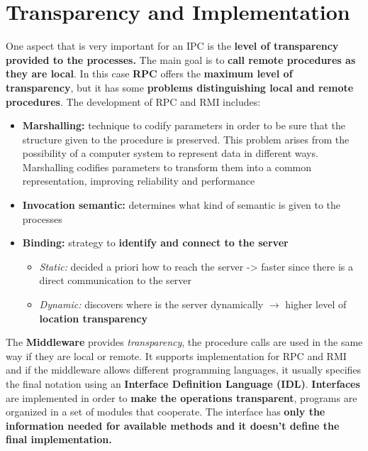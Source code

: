 \section{Transparency and Implementation}
One aspect that is very important for an IPC is the \textbf{level of transparency provided to the processes.} The main goal is to \textbf{call remote procedures as they are local}. In this case \textbf{RPC} offers the \textbf{maximum level of transparency}, but it has some \textbf{problems distinguishing local and remote procedures}. The development of RPC and RMI includes:
\begin{itemize}
    \item \textbf{Marshalling:} technique to codify parameters in order to be sure that the structure given to the procedure is preserved. This problem arises from the possibility of a computer system to represent data in different ways. Marshalling codifies parameters to transform them into a common representation, improving reliability and performance
    \item \textbf{Invocation semantic:}  determines what kind of semantic is given to the processes
    \item \textbf{Binding:} strategy to \textbf{identify and connect to the server}
        \begin{itemize}
            \item \textit{Static:} decided a priori how to reach the server -> faster since there is a direct communication to the server
            \item \textit{Dynamic:} discovers where is the server dynamically \(\rightarrow\) higher level of \textbf{location transparency}
        \end{itemize}
\end{itemize}
The \textbf{Middleware} provides \textit{transparency}, the procedure calls are used in the same way if they are local or remote. It supports implementation for RPC and RMI and if the middleware allows different programming languages, it usually specifies the final notation using an \textbf{Interface Definition Language (IDL)}.
\textbf{Interfaces} are implemented in order to \textbf{make the operations transparent}, programs are organized in a set of modules that cooperate. The interface has \textbf{only the information needed for available methods and it doesn’t define the final implementation.}

